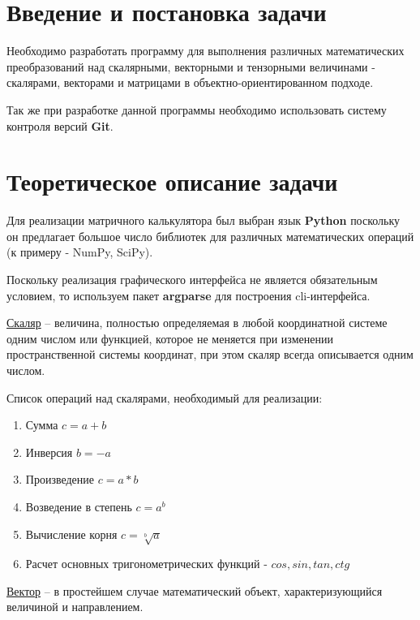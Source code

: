 \documentclass[a4paper,14pt]{extarticle}
\begin{document}
\section{Введение и постановка задачи}
Необходимо разработать программу для выполнения различных математических преобразований над скалярными, векторными и тензорными величинами - скалярами, векторами и матрицами в объектно-ориентированном подходе.

Так же при разработке данной программы необходимо использовать систему контроля версий \textbf{Git}.

\section{Теоретическое описание задачи}
Для реализации матричного калькулятора был выбран язык \textbf{Python} поскольку он предлагает большое число библиотек для различных математических операций (к примеру - NumPy, SciPy).

Поскольку реализация графического интерфейса не является обязательным условием, 
то используем пакет \textbf{argparse} для построения cli-интерфейса. 

\href{https://ru.wikipedia.org/wiki/%D0%A1%D0%BA%D0%B0%D0%BB%D1%8F%D1%80}{Скаляр} 
-- величина, полностью определяемая в любой координатной системе одним числом или функцией, которое не меняется при изменении пространственной системы координат, при этом скаляр всегда описывается одним числом.

Список операций над скалярами, необходимый для реализации:
\begin{enumerate}
	\item Сумма $c = a + b$
	\item Инверсия $b = -a$
	\item Произведение $c = a * b$
	\item Возведение в степень $c = a^b$
	\item Вычисление корня $c = \sqrt[b]{a}$
	\item Расчет основных тригонометрических функций - $cos, sin, tan, ctg$
\end{enumerate}

\href{https://ru.wikipedia.org/wiki/%D0%92%D0%B5%D0%BA%D1%82%D0%BE%D1%80_(%D0%BC%D0%B0%D1%82%D0%B5%D0%BC%D0%B0%D1%82%D0%B8%D0%BA%D0%B0)}{Вектор}
-- в простейшем случае математический объект, характеризующийся величиной и направлением.
\end{document}
